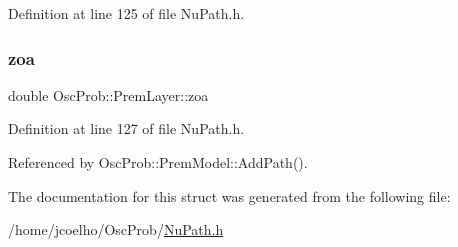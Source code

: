 Definition at line 125 of file Nu\+Path.\+h.

\mbox{\label{structOscProb_1_1PremLayer_a8687a8169d786fca79908292d11077f5}} 
\subsubsection{\texorpdfstring{zoa}{zoa}}
{\footnotesize\ttfamily double Osc\+Prob\+::\+Prem\+Layer\+::zoa}



Definition at line 127 of file Nu\+Path.\+h.



Referenced by Osc\+Prob\+::\+Prem\+Model\+::\+Add\+Path().



The documentation for this struct was generated from the following file\+:\begin{DoxyCompactItemize}
\item 
/home/jcoelho/\+Osc\+Prob/\hyperlink{NuPath_8h}{Nu\+Path.\+h}\end{DoxyCompactItemize}
